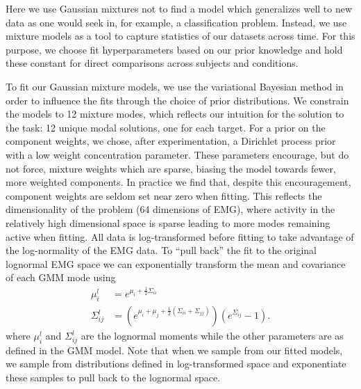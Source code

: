 \documentclass[../main.tex]{subfiles}
\begin{document}

Here we use Gaussian mixtures not to find a model which generalizes well to new data as one would seek in, for example, a classification problem. Instead, we use mixture models as a tool to capture statistics of our datasets across time. For this purpose, we choose fit hyperparameters based on our prior knowledge and hold these constant for direct comparisons across subjects and conditions.

To fit our Gaussian mixture models, we use the variational Bayesian method in order to influence the fits through the choice of prior distributions. We constrain the models to 12 mixture modes, which reflects our intuition for the solution to the task: 12 unique modal solutions, one for each target. For a prior on the component weights, we chose, after experimentation, a Dirichlet process prior with a low weight concentration parameter. These parameters encourage, but do not force, mixture weights which are sparse, biasing the model towards fewer, more weighted components. In practice we find that, despite this encouragement, component weights are seldom set near zero when fitting. This reflects the dimensionality of the problem (64 dimensions of EMG), where activity in the relatively high dimensional space is sparse leading to more modes remaining active when fitting. All data is log-transformed before fitting to take advantage of the log-normality of the EMG data. To ``pull back'' the fit to the original lognormal EMG space we can exponentially transform the mean and covariance of each GMM mode using
%
\begin{align}
  \mu_i^l &= e^{{\mu}_i + \frac{1}{2}\Sigma_{ii}}\\
  \Sigma_{ij}^l &= \left(e^{\mu_i + \mu_j + \frac{1}{2}\left(\Sigma_{ii} + \Sigma_{jj}\right)}\right)\left(e^{\Sigma_{ij}} - 1\right).
\end{align}
%
where $\mu_i^l$ and $\Sigma_{ij}^l$ are the lognormal moments while the other parameters are as defined in the GMM model. Note that when we sample from our fitted models, we sample from distributions defined in log-transformed space and exponentiate these samples to pull back to the lognormal space. 
\end{document}
